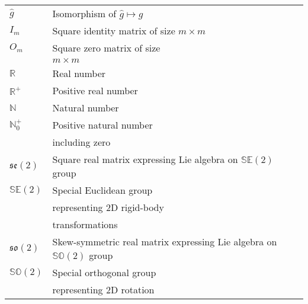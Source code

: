 \begin{spacing}{0.9}
\begin{multicols}{2}
\begin{table}[H]
\begin{tabular}{p{1.5cm} p{5cm}}
    $\hat{g}$ & Isomorphism of $\hat{g} \longmapsto g$ \\
    $I_m$    & Square identity matrix of size $m \times m$ \\
    $O_m$    & Square zero matrix of size \\ 
             & $m \times m$ \\
    $\mathbb{R}$ & Real number\\
    $\mathbb{R}^+$ & Positive real number\\
    $\mathbb{N}$ & Natural number\\
    $\mathbb{N}^+_0$ & Positive natural number \\ 
                     & including zero\\
    $\mathfrak{se}(2)$ & Square real matrix expressing Lie algebra on $\mathbb{SE}(2)$ group  \\
    $\mathbb{SE}(2)$ & Special Euclidean group \\ 
                     & representing 2D rigid-body \\
                     & transformations\\
    $\mathfrak{so}(2)$ & Skew-symmetric real matrix expressing Lie algebra on $\mathbb{SO}(2)$ group\\
    $\mathbb{SO}(2)$ &  Special orthogonal group \\
                     & representing 2D rotation \\
    \hline
    

    \end{tabular}
\end{table}



\end{multicols}
\end{spacing}
